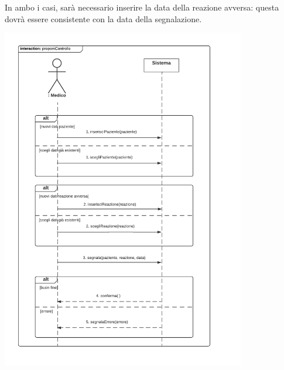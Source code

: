 \documentclass[11pt]{article}
\begin{document}
    \newpage
    In ambo i casi, sarà necessario inserire la data della reazione avversa: questa dovrà essere consistente con la data della segnalazione.
        \begin{center}
            \includegraphics[width=0.80\textwidth]{pictures/SDMedico1_Segnalazione.png}
        \end{center}

    \newpage
\end{document}
